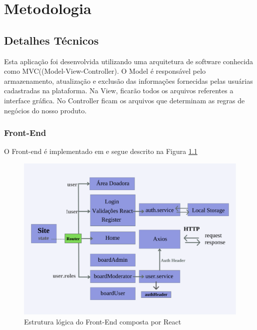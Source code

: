 \chapter{Metodologia}
\section{Detalhes Técnicos}
\label{sec:tech}

Esta aplicação foi desenvolvida utilizando uma arquitetura de software conhecida como MVC((Model-View-Controller).
O Model é responsável pelo armazenamento, atualização e exclusão das informações fornecidas pelas usuárias cadastradas na plataforma.
Na View, ficarão todos os arquivos referentes a interface gráfica.
No Controller ficam os arquivos que determinam as regras de negócios do nosso produto.

\subsection{Front-End}
O Front-end é implementado em \cite{React} e segue descrito na Figura \ref{fig:logicFront}

\begin{figure}[h!]
    \centering
    \includegraphics[width=1.0\textwidth]{Figuras/Frontpdf.pdf}
    \caption{Estrutura lógica do Front-End composta por React}
    \label{fig:logicFront}
\end{figure}

